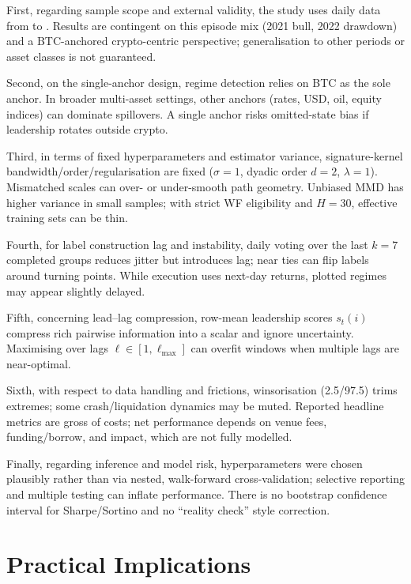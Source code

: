First, regarding sample scope and external validity, the study uses daily data from \sampleStart{} to \sampleEnd{}. Results are contingent on this episode mix (2021 bull, 2022 drawdown) and a BTC-anchored crypto-centric perspective; generalisation to other periods or asset classes is not guaranteed.

Second, on the single-anchor design, regime detection relies on BTC as the sole anchor. In broader multi-asset settings, other anchors (rates, USD, oil, equity indices) can dominate spillovers. A single anchor risks omitted-state bias if leadership rotates outside crypto.

Third, in terms of fixed hyperparameters and estimator variance, signature-kernel bandwidth/order/regularisation are fixed (\(\sigma{=}1\), dyadic order \(d{=}2\), \(\lambda{=}1\)). Mismatched scales can over- or under-smooth path geometry. Unbiased MMD has higher variance in small samples; with strict WF eligibility and \(H{=}30\), effective training sets can be thin.

Fourth, for label construction lag and instability, daily voting over the last \(k{=}7\) completed groups reduces jitter but introduces lag; near ties can flip labels around turning points. While execution uses next-day returns, plotted regimes may appear slightly delayed.

Fifth, concerning lead–lag compression, row-mean leadership scores \(s_t(i)\) compress rich pairwise information into a scalar and ignore uncertainty. Maximising over lags \(\ell\in[1,\ell_{\max}]\) can overfit windows when multiple lags are near-optimal.

Sixth, with respect to data handling and frictions, winsorisation (2.5/97.5) trims extremes; some crash/liquidation dynamics may be muted. Reported headline metrics are gross of costs; net performance depends on venue fees, funding/borrow, and impact, which are not fully modelled.

Finally, regarding inference and model risk, hyperparameters were chosen plausibly rather than via nested, walk-forward cross-validation; selective reporting and multiple testing can inflate performance. There is no bootstrap confidence interval for Sharpe/Sortino and no “reality check” style correction.


\section{Practical Implications}\label{sec:disc:practice}

